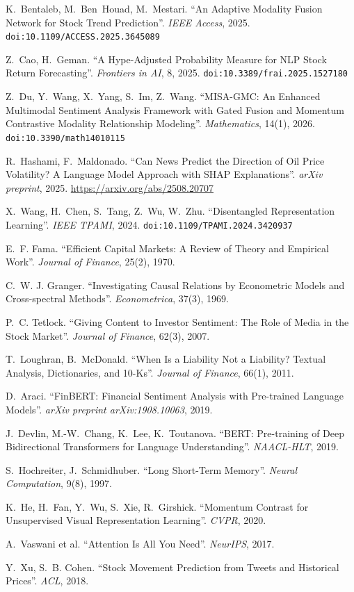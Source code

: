 \documentclass[12pt, a4paper]{article}
\begin{document}
\begin{enumerate}[label={[\arabic*]}]
    \item K.~Bentaleb, M.~Ben~Houad, M.~Mestari. ``An Adaptive Modality Fusion Network for Stock Trend Prediction''. \textit{IEEE Access}, 2025. \texttt{doi:10.1109/ACCESS.2025.3645089}
    \item Z.~Cao, H.~Geman. ``A Hype-Adjusted Probability Measure for NLP Stock Return Forecasting''. \textit{Frontiers in AI}, 8, 2025. \texttt{doi:10.3389/frai.2025.1527180}
    \item Z.~Du, Y.~Wang, X.~Yang, S.~Im, Z.~Wang. ``MISA-GMC: An Enhanced Multimodal Sentiment Analysis Framework with Gated Fusion and Momentum Contrastive Modality Relationship Modeling''. \textit{Mathematics}, 14(1), 2026. \texttt{doi:10.3390/math14010115}
    \item R.~Hashami, F.~Maldonado. ``Can News Predict the Direction of Oil Price Volatility? A Language Model Approach with SHAP Explanations''. \textit{arXiv preprint}, 2025. \url{https://arxiv.org/abs/2508.20707}
    \item X.~Wang, H.~Chen, S.~Tang, Z.~Wu, W.~Zhu. ``Disentangled Representation Learning''. \textit{IEEE TPAMI}, 2024. \texttt{doi:10.1109/TPAMI.2024.3420937}
    \item E.~F. Fama. ``Efficient Capital Markets: A Review of Theory and Empirical Work''. \textit{Journal of Finance}, 25(2), 1970.
    \item C.~W. J. Granger. ``Investigating Causal Relations by Econometric Models and Cross-spectral Methods''. \textit{Econometrica}, 37(3), 1969.
    \item P.~C. Tetlock. ``Giving Content to Investor Sentiment: The Role of Media in the Stock Market''. \textit{Journal of Finance}, 62(3), 2007.
    \item T.~Loughran, B.~McDonald. ``When Is a Liability Not a Liability? Textual Analysis, Dictionaries, and 10-Ks''. \textit{Journal of Finance}, 66(1), 2011.
    \item D.~Araci. ``FinBERT: Financial Sentiment Analysis with Pre-trained Language Models''. \textit{arXiv preprint arXiv:1908.10063}, 2019.
    \item J.~Devlin, M.-W.~Chang, K.~Lee, K.~Toutanova. ``BERT: Pre-training of Deep Bidirectional Transformers for Language Understanding''. \textit{NAACL-HLT}, 2019.
    \item S.~Hochreiter, J.~Schmidhuber. ``Long Short-Term Memory''. \textit{Neural Computation}, 9(8), 1997.
    \item K.~He, H.~Fan, Y.~Wu, S.~Xie, R.~Girshick. ``Momentum Contrast for Unsupervised Visual Representation Learning''. \textit{CVPR}, 2020.
    \item A.~Vaswani et al. ``Attention Is All You Need''. \textit{NeurIPS}, 2017.
    \item Y.~Xu, S.~B. Cohen. ``Stock Movement Prediction from Tweets and Historical Prices''. \textit{ACL}, 2018.
\end{enumerate}
\end{document}
